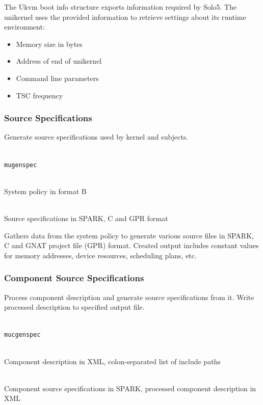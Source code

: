 \documentclass[a4paper,twoside,titlepage]{article}
\begin{document}
The Ukvm boot info structure exports information required by Solo5. The
unikernel uses the provided information to retrieve settings about its runtime
environment:
\begin{itemize}
	\item Memory size in bytes
	\item Address of end of unikernel
	\item Command line parameters
	\item TSC frequency
\end{itemize}

\subsubsection{Source Specifications}
\label{sec:tools-gen-spec}
Generate source specifications used by kernel and subjects.

\begin{description} \itemsep1pt \parskip0pt
	\item[Name] \hfill \\
		\texttt{mugenspec}
	\item[Input] \hfill \\
		System policy in format B
	\item[Output] \hfill \\
		Source specifications in SPARK, C and GPR format
\end{description}

Gathers data from the system policy to generate various source files in SPARK,
C and GNAT project file (GPR) format. Created output includes constant values
for memory addresses, device resources, scheduling plans, etc.

\subsubsection{Component Source Specifications}
\label{sec:tools-cgen-spec}
Process component description and generate source specifications from it. Write
processed description to specified output file.

\begin{description} \itemsep1pt \parskip0pt
	\item[Name] \hfill \\
		\texttt{mucgenspec}
	\item[Input] \hfill \\
		Component description in XML, colon-separated list of include paths
	\item[Output] \hfill \\
		Component source specifications in SPARK, processed component
		description in XML
\end{description}
\end{document}
